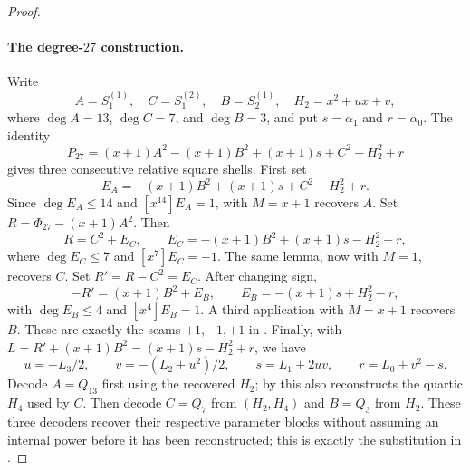 \begin{proof}
    \paragraph{The degree-$27$ construction.}
    Write
    \[
      A=S^{(1)}_1,\quad C=S^{(2)}_1,\quad B=S^{(1)}_2,
      \quad H_2=x^2+ux+v,
    \]
    where $\deg A=13$, $\deg C=7$, and $\deg B=3$, and put
    $s=\alpha _1$ and $r=\alpha _0$.  The identity
    \[
      P_{27}=(x+1)A^2-(x+1)B^2+(x+1)s+C^2-H_2^2+r
    \]
    gives three consecutive relative square shells.  First set
    \[
      E_A=-(x+1)B^2+(x+1)s+C^2-H_2^2+r.
    \]
    Since $\deg E_A\le14$ and $[x^{14}]E_A=1$,
     with $M=x+1$ recovers $A$.  Set
    $R=\Phi_{27}-(x+1)A^2$.  Then
    \[
      R=C^2+E_C,\qquad
      E_C=-(x+1)B^2+(x+1)s-H_2^2+r,
    \]
    where $\deg E_C\le7$ and $[x^7]E_C=-1$.  The same lemma, now with
    $M=1$, recovers $C$.  Set $R'=R-C^2=E_C$.  After changing sign,
    \[
      -R'=(x+1)B^2+E_B,\qquad
      E_B=-(x+1)s+H_2^2-r,
    \]
    with $\deg E_B\le4$ and $[x^4]E_B=1$.  A third application with
    $M=x+1$ recovers $B$.  These are exactly the seams $+1,-1,+1$ in
    .  Finally, with
    $L=R'+(x+1)B^2=(x+1)s-H_2^2+r$, we have
    \[
      u=-L_3/2,\qquad v=-(L_2+u^2)/2,\qquad
      s=L_1+2uv,\qquad r=L_0+v^2-s.
    \]
    Decode $A=Q_{13}$ first using the recovered $H_2$; by
     this also reconstructs the quartic $H_4$ used
    by $C$.  Then decode $C=Q_7$ from $(H_2,H_4)$ and $B=Q_3$ from $H_2$.
    These three decoders recover their respective parameter blocks without
    assuming an internal power before it has been reconstructed; this is
    exactly the substitution in .


\end{proof}
